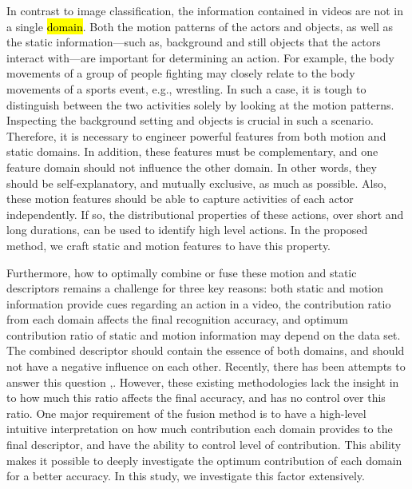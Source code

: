 In contrast to image classification, the information contained in videos
are not in a single \hl{domain}. Both the motion patterns of the actors and objects, as well as the static
 information---such as, background and still objects that the actors interact with---are important for determining an action.
For example, the body movements of a group of people fighting may closely relate to
the body movements of a sports event, e.g., wrestling. In such a case, it is tough to distinguish between the two
activities solely by looking at the motion patterns. Inspecting the background setting
and objects is crucial in such a scenario. Therefore, it is necessary to engineer powerful features
from both motion and static domains. In addition, these features must be complementary, and one feature domain should
not influence the other domain. In other words, they should be self-explanatory, and mutually exclusive, as much as possible.
Also, these motion features should be able to capture
activities of each actor independently. If so, the distributional properties of these actions, over short
and long durations, can be used to identify high level actions. In the proposed method, we craft static and motion features to have this property.

Furthermore, how to optimally combine or fuse these motion and static descriptors remains a challenge for three key reasons: both static and motion information
provide cues regarding an action in a video, the contribution ratio from each domain affects the final recognition accuracy,
and optimum contribution ratio of static and motion information may depend on the data set.
The combined descriptor should contain the essence of both domains, and should not have a
negative influence on each other. Recently, there has been attempts to answer this question \cite{7486474},\cite{simonyan2014two}. However,
these existing methodologies lack the insight in to how much this ratio affects the final accuracy, and has no control over this ratio.
One major requirement of the fusion method is to have a high-level intuitive interpretation on how much contribution each domain provides to the
final descriptor, and have the ability to control level of contribution. This ability makes it possible
to deeply investigate the optimum contribution of each domain for a better accuracy. In this study, we investigate this factor
extensively.

